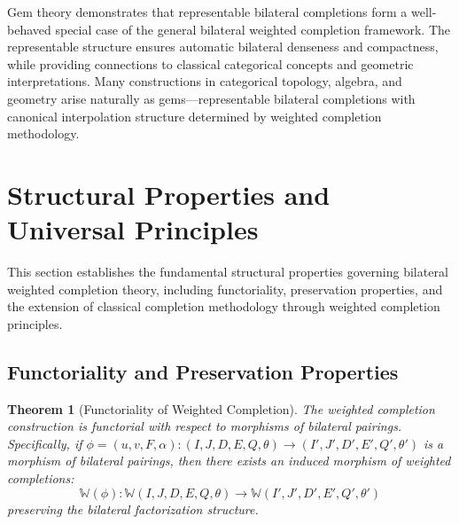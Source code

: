 \documentclass[11pt]{article}
\theoremstyle{plain}
\newtheorem{theorem}{Theorem}[section]
\theoremstyle{definition}
\theoremstyle{remark}
\begin{document}
Gem theory demonstrates that representable bilateral completions form a well-behaved special case of the general bilateral weighted completion framework. The representable structure ensures automatic bilateral denseness and compactness, while providing connections to classical categorical concepts and geometric interpretations. Many constructions in categorical topology, algebra, and geometry arise naturally as gems---representable bilateral completions with canonical interpolation structure determined by weighted completion methodology.

\section{Structural Properties and Universal Principles}

This section establishes the fundamental structural properties governing bilateral weighted completion theory, including functoriality, preservation properties, and the extension of classical completion methodology through weighted completion principles.

\subsection{Functoriality and Preservation Properties}

\begin{theorem}[Functoriality of Weighted Completion]\label{thm:completion-functorial}
The weighted completion construction is functorial with respect to morphisms of bilateral pairings. Specifically, if $\phi = (u, v, F, \alpha) : (I, J, D, E, Q, \theta) \to (I', J', D', E', Q', \theta')$ is a morphism of bilateral pairings, then there exists an induced morphism of weighted completions:
$$\mathbb{W}(\phi) : \mathbb{W}(I, J, D, E, Q, \theta) \to \mathbb{W}(I', J', D', E', Q', \theta')$$
preserving the bilateral factorization structure.
\end{theorem}
\end{document}
